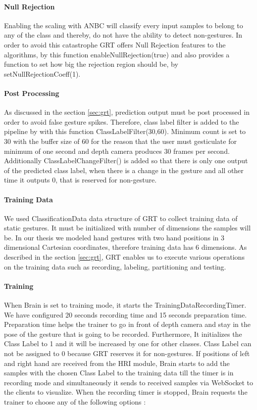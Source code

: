 \paragraph*{Null Rejection} Enabling the scaling with ANBC will classify every input samples to belong to any of the class and thereby, do not have the ability to detect non-gestures. In order to avoid this catastrophe GRT offers Null Rejection features to the algorithms, by this function enableNullRejection(true) and also provides a function to set how big the rejection region should be, by setNullRejectionCoeff(1).

\paragraph*{Post Processing} As discussed in the section \ref{sec:grt}, prediction output must be post processed in order to avoid false gesture spikes. Therefore, class label filter is added to the pipeline by with this function ClassLabelFilter(30,60). Minimum count is set to 30 with the buffer size of 60 for the reason that the user must gesticulate for minimum of one second and depth camera produces 30 frames per second. Additionally  ClassLabelChangeFilter() is added so that there is only one output of the predicted class label, when there is a change in the gesture and all other time it outputs 0, that is reserved for non-gesture.

\paragraph*{Training Data} We used ClassificationData data structure of GRT to collect training data of static gestures. It must be initialized with number of dimensions the samples will be. In our thesis we modeled hand gestures with two hand positions in 3 dimensional Cartesian coordinates, therefore training data has 6 dimensions.
As described in the section \ref{sec:grt}, GRT enables us to execute various operations on the training data such as recording, labeling, partitioning and testing.  

\paragraph*{Training} When Brain is set to training mode, it starts the TrainingDataRecordingTimer. We have configured 20 seconds recording time and 15 seconds preparation time. Preparation time helps the trainer to go in front of depth camera and stay in the pose of the gesture that is going to be recorded. Furthermore, It initializes the Class Label to 1 and it will be increased by one for other classes. Class Label can not be assigned to 0 because GRT reserves it for non-gestures. If positions of left and right hand are received from the HRI module, Brain starts to add the samples with the chosen Class Label to the training data till the timer is in recording mode and simultaneously it sends to received samples via WebSocket to the clients to visualize. When the recording timer is stopped, Brain requests the trainer to choose any of the following options :

